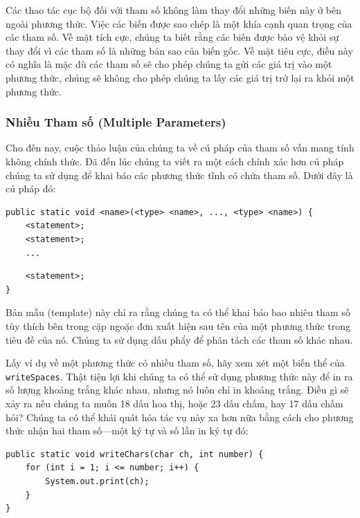 Các thao tác cục bộ đối với tham số không làm thay đổi những biến này ở
bên ngoài phương thức. Việc các biến được sao chép là một khía cạnh quan
trọng của các tham số. Về mặt tích cực, chúng ta biết rằng các biến được
bảo vệ khỏi sự thay đổi vì các tham số là những bản sao của biến gốc. Về
mặt tiêu cực, điều này có nghĩa là mặc dù các tham số sẽ cho phép chúng
ta gửi các giá trị vào một phương thức, chúng sẽ không cho phép chúng ta
lấy các giá trị trở lại ra khỏi một phương thức.

\subsubsection{Nhiều Tham số (Multiple
Parameters)}\label{nhiux1ec1u-tham-sux1ed1-multiple-parameters}

Cho đến nay, cuộc thảo luận của chúng ta về cú pháp của tham số vẫn mang
tính không chính thức. Đã đến lúc chúng ta viết ra một cách chính xác
hơn cú pháp chúng ta sử dụng để khai báo các phương thức tĩnh có chứa
tham số. Dưới đây là cú pháp đó:

\begin{verbatim}
public static void <name>(<type> <name>, ..., <type> <name>) {
    <statement>;
    <statement>;
    ...
\end{verbatim}

\begin{verbatim}
    <statement>;
}
\end{verbatim}

Bản mẫu (template) này chỉ ra rằng chúng ta có thể khai báo bao nhiêu
tham số tùy thích bên trong cặp ngoặc đơn xuất hiện sau tên của một
phương thức trong tiêu đề của nó. Chúng ta sử dụng dấu phẩy để phân tách
các tham số khác nhau.

Lấy ví dụ về một phương thức có nhiều tham số, hãy xem xét một biến thể
của \texttt{writeSpaces}. Thật tiện lợi khi chúng ta có thể sử dụng
phương thức này để in ra số lượng khoảng trắng khác nhau, nhưng nó luôn
chỉ in khoảng trắng. Điều gì sẽ xảy ra nếu chúng ta muốn 18 dấu hoa thị,
hoặc 23 dấu chấm, hay 17 dấu chấm hỏi? Chúng ta có thể khái quát hóa tác
vụ này xa hơn nữa bằng cách cho phương thức nhận hai tham số---một ký tự
và số lần in ký tự đó:

\begin{verbatim}
public static void writeChars(char ch, int number) {
    for (int i = 1; i <= number; i++) {
        System.out.print(ch);
    }
}
\end{verbatim}

